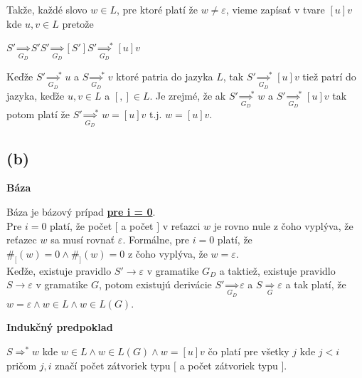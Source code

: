 \documentclass[11pt,a4paper]{article}
\begin{document}
Takže, každé slovo $w \in L$, pre ktoré platí že $w \neq \varepsilon$, vieme zapísať v tvare $[u]v$ kde $u,v \in L$ pretože

\begin{center}
$S' \underset{G_D}{\Rightarrow} S'S' \underset{G_D}{\Rightarrow} [S']S' {\underset{G_D}{\Rightarrow}}^{*} [u]v$
\end{center}

Keďže $S' {\underset{G_D}{\Rightarrow}}^* u$ a $S {\underset{G_D}{\Rightarrow}}^* v$ ktoré patria do jazyka $L$, tak $S' {\underset{G_D}{\Rightarrow}}^* [u]v$ tiež patrí do jazyka, keďže $u, v \in L$ a $[,] \in L$. Je zrejmé, že ak $S' {\underset{G_D}{\Rightarrow}}^* w$ a $S' {\underset{G_D}{\Rightarrow}}^* [u]v$ tak potom platí že $S' {\underset{G_D}{\Rightarrow}}^* w = [u]v$ t.j. $w = [u]v$.

\subsection{(b)}

\textbf{Báza}
\begin{flushright}
\begin{minipage}{0.95\textwidth}
    Báza je bázový prípad \underline{\textbf{pre i = 0}}.\\

    Pre $i=0$ platí, že počet $[$ a počet $]$ v reťazci $w$ je rovno nule z čoho vyplýva, že reťazec $w$ sa musí rovnať $\varepsilon$. Formálne, pre $i=0$ platí, že $\#_{[}(w) = 0 \wedge \#_{]}(w) = 0$ z čoho vyplýva, že $w = \varepsilon$.\\

    Keďže, existuje pravidlo $S' \rightarrow \varepsilon$ v gramatike $G_D$ a taktiež, existuje pravidlo $S \rightarrow \varepsilon$ v gramatike $G$, potom existujú derivácie $S' \underset{G_D}{\Rightarrow} \varepsilon$ a $S \underset{G}{\Rightarrow} \varepsilon$ a tak platí, že $w = \varepsilon \wedge w \in L \wedge w \in L(G)$.
\end{minipage}
\end{flushright}

\textbf{Indukčný predpoklad}
\begin{flushright}
\begin{minipage}{0.95\textwidth}
    $S \Rightarrow^{*} w$ kde $w \in L \wedge w \in L(G) \wedge w = [u]v$ čo platí pre všetky $j$ kde $j < i$ pričom $j, i$ značí počet zátvoriek typu $[$ a počet zátvoriek typu $]$.
\end{minipage}
\end{flushright}
\end{document}
